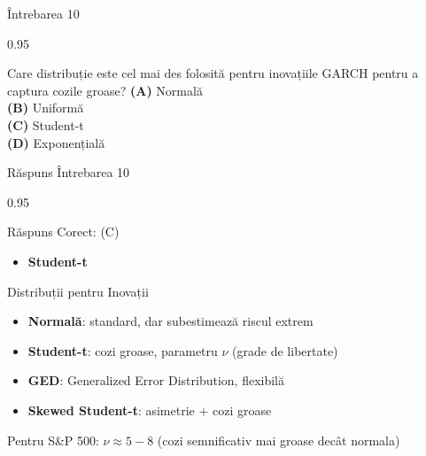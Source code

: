 \documentclass[9pt, aspectratio=169, t]{beamer}
\begin{document}
\begin{frame}{Întrebarea 10}
    \begin{cminipage}{0.95\textwidth}
    \begin{block}{Care distribuție este cel mai des folosită pentru inovațiile GARCH pentru a captura cozile groase?}
        \textcolor{MainBlue}{\textbf{(A)}} Normală\\[3pt]
        \textcolor{MainBlue}{\textbf{(B)}} Uniformă\\[3pt]
        \textcolor{MainBlue}{\textbf{(C)}} Student-t\\[3pt]
        \textcolor{MainBlue}{\textbf{(D)}} Exponențială
    \end{block}
    \end{cminipage}
\end{frame}

\begin{frame}{Răspuns Întrebarea 10}
    \begin{cminipage}{0.95\textwidth}
    \begin{exampleblock}{Răspuns Corect: (C)}
        \begin{itemize}\setlength{\itemsep}{0pt}
            \item \textbf{Student-t}
        \end{itemize}
    \end{exampleblock}

    \pause
    \begin{block}{Distribuții pentru Inovații}
        \begin{itemize}\setlength{\itemsep}{0pt}
            \item \textbf{Normală}: standard, dar subestimează riscul extrem
            \item \textbf{Student-t}: cozi groase, parametru $\nu$ (grade de libertate)
            \item \textbf{GED}: Generalized Error Distribution, flexibilă
            \item \textbf{Skewed Student-t}: asimetrie + cozi groase
        \end{itemize}

        \vspace{0.3cm}
        Pentru S\&P 500: $\nu \approx 5-8$ (cozi semnificativ mai groase decât normala)
    \end{block}
    \end{cminipage}
\end{frame}
\end{document}
